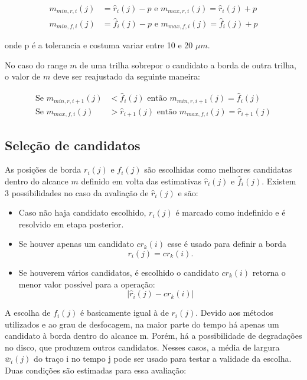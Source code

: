 \documentclass[
	12pt,				%
	openright,			%
	twoside,			%
	a4paper,			%
	english,			%
	french,				%
	spanish,			%
	brazil				%
	]{abntex2}
\newcommand{\estimr}{\hat{r}_i(j)}
\newcommand{\estimf}{\hat{f}_i(j)}
\newcommand{\func}[3]{#1_{#2}(#3)}
\newcommand{\funchat}[3]{\hat{#1}_{#2}(#3)}
\newcommand{\funcbar}[3]{\overline{#1}_{#2}(#3)}
\begin{document}
\begin{align}
\func{m}{min,r,i}{j} &= \estimr - p
\textrm{ e }
\func{m}{max,r,i}{j} = \estimr + p \\
\func{m}{min,f,i}{j} &= \estimf - p
\textrm{ e }
\func{m}{max,f,i}{j} = \estimf + p
\end{align}

onde p é a tolerancia e costuma variar entre 10 e 20 $\mu m$.

No caso do range $m$ de uma trilha sobrepor o candidato a borda de outra trilha, o valor de $m$ deve ser reajustado da seguinte maneira:


\begin{align}
\textrm{Se }
\func{m}{min,r,i+1}{j} &< \estimf
\textrm{ então }
\func{m}{min,r,i+1}{j} = \estimf \\
\textrm{Se }
\func{m}{max,f,i}{j} &> \funchat{r}{i+1}{j}
\textrm{ então }
\func{m}{max,f,i}{j} = \funchat{r}{i+1}{j}
\end{align}


\subsection{Seleção de candidatos}
As posições de borda $\func{r}{i}{j}$ e $\func{f}{i}{j}$ são escolhidas como melhores candidatas dentro do alcance $m$ definido em volta das estimativas $\estimr$ e $\estimf$.
Existem 3 possibilidades no caso da avaliação de $\estimr$ e são:
\begin{itemize}
\item Caso não haja candidato escolhido, $\func{r}{i}{j}$ é marcado como indefinido e é resolvido em etapa posterior.
\item Se houver apenas um candidato $\func{cr}{k}{i}$ esse é usado para definir a borda
\begin{equation}
\func{r}{i}{j} = \func{cr}{k}{i}.
\end{equation}
\item Se houverem vários candidatos, é escolhido o candidato $\func{cr}{k}{i}$ retorna o menor valor possível para a operação:
\begin{equation}
 | \estimr - \func{cr}{k}{i} |
\end{equation}
\end{itemize}
    

A escolha de $\func{f}{i}{j}$ é basicamente igual à de $\func{r}{i}{j}$. Devido aos métodos utilizados e ao grau de desfocagem, na maior parte do tempo há apenas um candidato à borda dentro do alcance m. Porém, há a possibilidade de degradações no disco, que produzem outros candidatos. Nesses casos, a média de largura $\funcbar{w}{i}{j}$ do traço i no tempo j pode ser usado para testar a validade da escolha. Duas condições são estimadas para essa avaliação:
\end{document}
